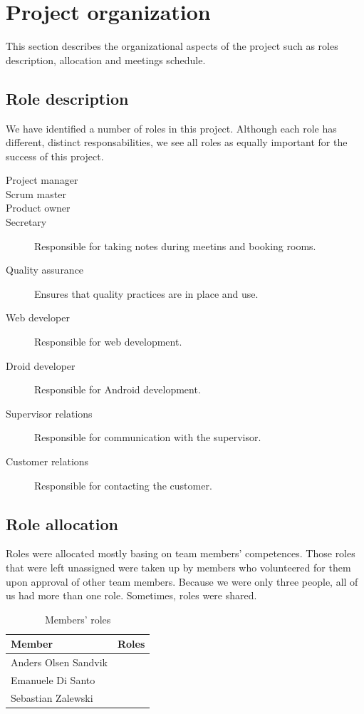 

\section{Project organization}
\label{section:organization}
This section describes the organizational aspects of the project such as roles description, allocation and meetings schedule.

\subsection{Role description}
We have identified a number of roles in this project. Although each role has different, distinct responsabilities, we see all roles as equally important for the success of this project.

\begin{description}
\item[Project manager]
\item[Scrum master]
\item[Product owner]
\item[Secretary]
Responsible for taking notes during meetins and booking rooms.
\item[Quality assurance]
Ensures that quality practices are in place and use.
\item[Web developer]
Responsible for web development.
\item[Droid developer]
Responsible for Android development.
\item[Supervisor relations]
Responsible for communication with the supervisor.
\item[Customer relations]
Responsible for contacting the customer.
\end{description}

\subsection{Role allocation}
Roles were allocated mostly basing on team members' competences.
Those roles that were left unassigned were taken up by members who volunteered for them upon approval of other team members.
Because we were only three people, all of us had more than one role. Sometimes, roles were shared.

\begin{table}
\begin{center}
\begin{tabular}{ | l | l | }
  \hline
  Member & Roles \\
  \hline\noalign{\smallskip}\noalign{\smallskip}\hline
  Anders Olsen Sandvik  &  \\
  Emanuele Di Santo     &  \\
  Sebastian Zalewski    &  \\
  \hline
\end{tabular}
\end{center}
\caption{Members' roles}
\label{table:roles}
\end{table}

